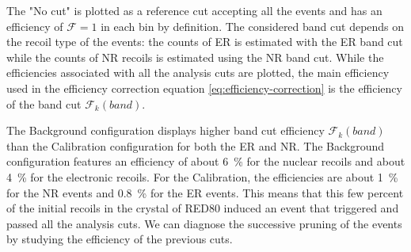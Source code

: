The "No cut" is plotted as a reference cut accepting all the events and has an efficiency of $\mathcal{F}=1$ in each bin by definition. The considered band cut depends on the recoil type of the events: the counts of ER is estimated with the ER band cut while the counts of NR recoils is estimated using the NR band cut.
While the efficiencies associated with all the analysis cuts are plotted, the main efficiency used in the efficiency correction equation \ref{eq:efficiency-correction} is the efficiency of the band cut $\mathcal{F}_k (band)$.

The Background configuration displays higher band cut efficiency $\mathcal{F}_k (band)$ than the Calibration configuration for both the ER and NR. The Background configuration features an efficiency of about \SI{6}{\percent} for the nuclear recoils and about \SI{4}{\percent} for the electronic recoils. For the Calibration, the efficiencies are about \SI{1}{\percent} for the NR events and \SI{0.8}{\percent} for the ER events. This means that this few percent of the initial recoils in the crystal of RED80 induced an event that triggered and passed all the analysis cuts. We can diagnose the successive pruning of the events by studying the efficiency of the previous cuts.


